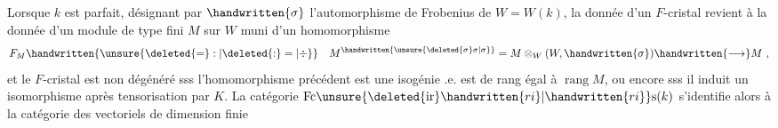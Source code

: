  Lorsque $k$ est parfait, désignant par $\handwritten{\sigma}$ l'automorphisme de Frobenius de $W=W(k)$, la donnée d'un $F$-cristal revient à la donnée d'un module de type fini $M$ sur $W$ muni d'un homomorphisme
\[
F_M\handwritten{\unsure{\deleted{=}:|\deleted{:}=|\div}}\quad M^{\handwritten{\unsure{\deleted{\sigma}\sigma|\sigma}}}=M\otimes_W(W,\handwritten{\sigma})\handwritten{\longrightarrow}M\ ,
\]
et le $F$-cristal est non dégénéré sss l'homomorphisme précédent est une isogénie .e. est de rang égal à $\operatorname{rang}M$, ou encore sss il induit un isomorphisme après tensorisation par $K$. La catégorie  $\mathrm{Fc}\unsure{\deleted{\mathrm{ir}}\handwritten{ri}|\handwritten{ri}}\mathrm{s}(k)$ s'identifie alors à la catégorie des vectoriels de dimension finie
